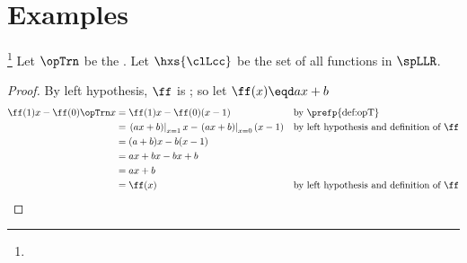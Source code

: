 


\section{Examples}
\begin{example}
\footnote{
  }
\label{ex:TD_flinear}
Let $\opTrn$ be the  .
Let $\hxs{\clLcc}$ be the set of all  functions in $\spLLR$.
\end{example}
\begin{proof}
By left hypothesis, $\ff$ is ; so let $\ff(x)\eqd ax + b$
\begin{align*}
  \ff(1)x - \ff(0)\opTrn x
    &= \ff(1)x - \ff(0)(x-1)
    && \text{by \prefp{def:opT}}
  \\&= \left.(ax+b)\right|_{x=1}x - \left.(ax+b)\right|_{x=0}(x-1)
    && \text{by left hypothesis and definition of $\ff$}
  \\&= (a+b)x - b(x-1)
  \\&= ax+bx-bx+b
  \\&= ax+b
  \\&= \ff(x)
    && \text{by left hypothesis and definition of $\ff$}
\end{align*}
\end{proof}

